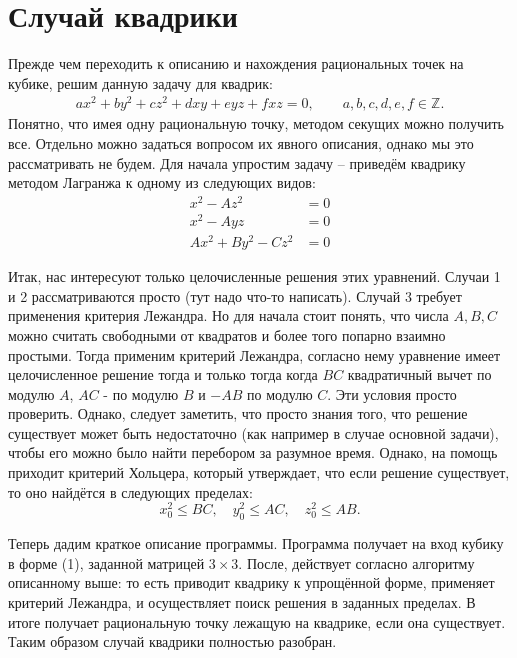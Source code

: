 \section*{Случай квадрики}



Прежде чем переходить к описанию и нахождения рациональных точек на кубике,
решим данную задачу для квадрик:
\begin{align}
    a x^2 + b y^2 + c z^2 + d x y + e y z + f x z = 0,  \qquad a, b, c, d, e, f \in
    \mathbb{Z} 
.\end{align}
Понятно, что имея одну рациональную точку, методом секущих можно получить
все. Отдельно можно задаться вопросом их явного описания, однако мы это
рассматривать не будем. Для начала упростим задачу -- приведём квадрику
методом Лагранжа к одному из следующих видов:
\begin{align*}
    x^2 - A z^2 &= 0 \\
    x^2 - A y z &= 0 \\
    A x^2 + B y^2 - C z^2 &= 0 
\end{align*}

Итак, нас интересуют только целочисленные решения этих уравнений. Случаи 1 и 2
рассматриваются просто (тут надо что-то написать). Случай 3 требует применения
критерия Лежандра. Но для начала стоит понять, что числа $ A, B, C$ можно
считать свободными от квадратов и более того попарно взаимно простыми. Тогда
применим критерий Лежандра, согласно нему уравнение имеет целочисленное
решение тогда и только тогда когда \(BC\) квадратичный вычет по модулю \(A\),
\(AC\) - по модулю \(B\) и \(-AB\)  по модулю \(C\). Эти условия просто
проверить. Однако, следует заметить, что просто знания того, что решение
существует может быть недостаточно (как например в случае основной задачи),
чтобы его можно было найти перебором за разумное время. Однако, на помощь
приходит критерий Хольцера, который утверждает, что если решение существует,
то оно найдётся в следующих пределах:
\[
x_0^2 \leqslant BC, \quad y_0^2 \leqslant AC, \quad z_0^2 \leqslant AB
.\] 

Теперь дадим краткое описание программы.  Программа получает на вход кубику в
форме (1), заданной матрицей \(3 \times 3\). После, действует согласно алгоритму
описанному выше: то есть приводит квадрику к упрощённой форме, применяет
критерий Лежандра, и осуществляет поиск решения в заданных пределах. В итоге
получает рациональную точку лежащую на квадрике, если она существует. Таким
образом случай квадрики полностью разобран.

\bigskip

